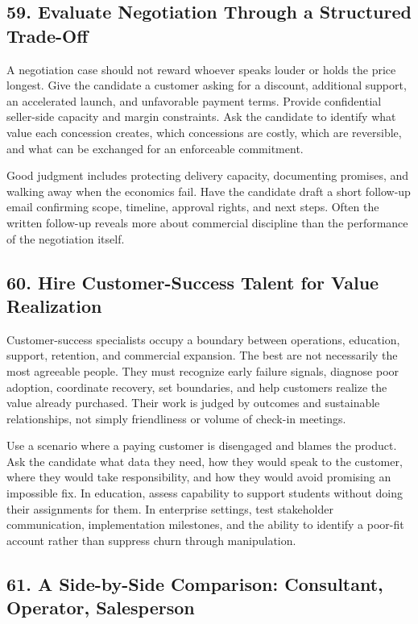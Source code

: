 \subsection*{59. Evaluate Negotiation Through a Structured Trade-Off}

A negotiation case should not reward whoever speaks louder or holds the price longest. Give the candidate a customer asking for a discount, additional support, an accelerated launch, and unfavorable payment terms. Provide confidential seller-side capacity and margin constraints. Ask the candidate to identify what value each concession creates, which concessions are costly, which are reversible, and what can be exchanged for an enforceable commitment.

Good judgment includes protecting delivery capacity, documenting promises, and walking away when the economics fail. Have the candidate draft a short follow-up email confirming scope, timeline, approval rights, and next steps. Often the written follow-up reveals more about commercial discipline than the performance of the negotiation itself.

\subsection*{60. Hire Customer-Success Talent for Value Realization}

Customer-success specialists occupy a boundary between operations, education, support, retention, and commercial expansion. The best are not necessarily the most agreeable people. They must recognize early failure signals, diagnose poor adoption, coordinate recovery, set boundaries, and help customers realize the value already purchased. Their work is judged by outcomes and sustainable relationships, not simply friendliness or volume of check-in meetings.

Use a scenario where a paying customer is disengaged and blames the product. Ask the candidate what data they need, how they would speak to the customer, where they would take responsibility, and how they would avoid promising an impossible fix. In education, assess capability to support students without doing their assignments for them. In enterprise settings, test stakeholder communication, implementation milestones, and the ability to identify a poor-fit account rather than suppress churn through manipulation.

\subsection*{61. A Side-by-Side Comparison: Consultant, Operator, Salesperson}

